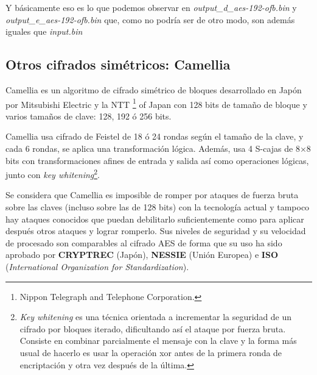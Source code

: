 \documentclass[a4paper, 11pt]{article}
\begin{document}
		Y básicamente eso es lo que podemos observar en \textit{output\_d\_aes-192-ofb.bin} y \textit{output\_e\_aes-192-ofb.bin}
		que, como no podría ser de otro modo, son además iguales que \textit{input.bin}
		
	\subsection{Otros cifrados simétricos: Camellia}
		Camellia es un algoritmo de cifrado simétrico de bloques desarrollado en Japón por Mitsubishi Electric y la NTT
		\footnote{Nippon Telegraph and Telephone Corporation.} of Japan con 128 bits de tamaño de bloque y varios tamaños de
		clave: 128, 192 ó 256 bits.
		
		Camellia usa cifrado de Feistel de 18 ó 24 rondas según el tamaño de la clave, y cada 6 rondas, se aplica una
		transformación lógica. Además, usa 4 S-cajas de 8$\times$8 bits con transformaciones afines de entrada y salida así
		como operaciones lógicas, junto con \textit{key whitening}\footnote{\textit{Key whitening} es una técnica orientada
		a incrementar la seguridad de un cifrado por bloques iterado, dificultando así el ataque por fuerza bruta. Consiste
		en combinar parcialmente el mensaje con la clave y la forma más usual de hacerlo es usar la operación xor antes de
		la primera ronda de encriptación y otra vez después de la última.}.

		Se considera que Camellia es imposible de romper por ataques de fuerza bruta sobre las claves (incluso sobre las de
		128 bits) con la tecnología actual y tampoco hay ataques conocidos que puedan debilitarlo suficientemente como para
		aplicar después otros ataques y lograr romperlo. Sus niveles de seguridad y su velocidad de procesado son comparables
		al cifrado AES de forma que su uso ha sido aprobado por \textbf{CRYPTREC} (Japón), \textbf{NESSIE} (Unión Europea)
		e \textbf{ISO} (\textit{International Organization for Standardization}).
		
\end{document}

